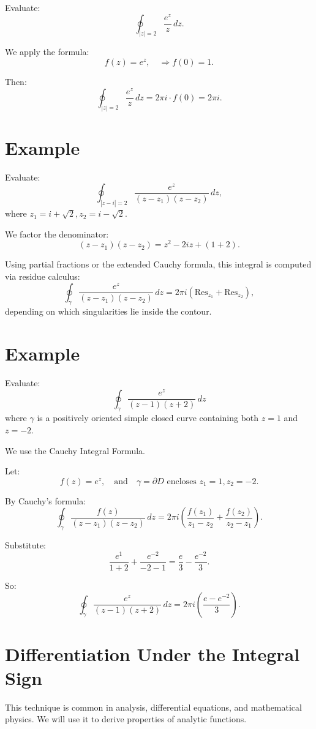 \documentclass[12pt]{article}
\theoremstyle{definition} %
\theoremstyle{plain} %
\begin{document}
Evaluate:
\[
\oint_{|z| = 2} \frac{e^z}{z}\, dz.
\]

We apply the formula:
\[
f(z) = e^z, \quad \Rightarrow f(0) = 1.
\]

Then:
\[
\oint_{|z|=2} \frac{e^z}{z}\,dz = 2\pi i \cdot f(0) = 2\pi i.
\]

\section*{Example}

Evaluate:
\[
\oint_{|z - i| = 2} \frac{e^z}{(z - z_1)(z - z_2)}\,dz,
\]
where $z_1 = i + \sqrt{2}, z_2 = i - \sqrt{2}$.

We factor the denominator:
\[
(z - z_1)(z - z_2) = z^2 - 2iz + (1 + 2).
\]

Using partial fractions or the extended Cauchy formula, this integral is computed via residue calculus:
\[
\oint_{\gamma} \frac{e^z}{(z - z_1)(z - z_2)}\,dz = 2\pi i \left( \text{Res}_{z_1} + \text{Res}_{z_2} \right),
\]
depending on which singularities lie inside the contour.

\section*{Example}

Evaluate:
\[
\oint_{\gamma} \frac{e^z}{(z - 1)(z + 2)}\,dz
\]
where $\gamma$ is a positively oriented simple closed curve containing both $z = 1$ and $z = -2$.

We use the Cauchy Integral Formula.

Let:
\[
f(z) = e^z, \quad \text{and} \quad \gamma = \partial D \text{ encloses } z_1 = 1, z_2 = -2.
\]

By Cauchy's formula:
\[
\oint_{\gamma} \frac{f(z)}{(z - z_1)(z - z_2)}\,dz = 2\pi i \left( \frac{f(z_1)}{z_1 - z_2} + \frac{f(z_2)}{z_2 - z_1} \right).
\]

Substitute:
\[
\frac{e^1}{1 + 2} + \frac{e^{-2}}{-2 - 1} = \frac{e}{3} - \frac{e^{-2}}{3}.
\]

So:
\[
\oint_{\gamma} \frac{e^z}{(z - 1)(z + 2)}\,dz = 2\pi i \left( \frac{e - e^{-2}}{3} \right).
\]

\section*{Differentiation Under the Integral Sign}

This technique is common in analysis, differential equations, and mathematical physics. We will use it to derive properties of analytic functions.
\end{document}
